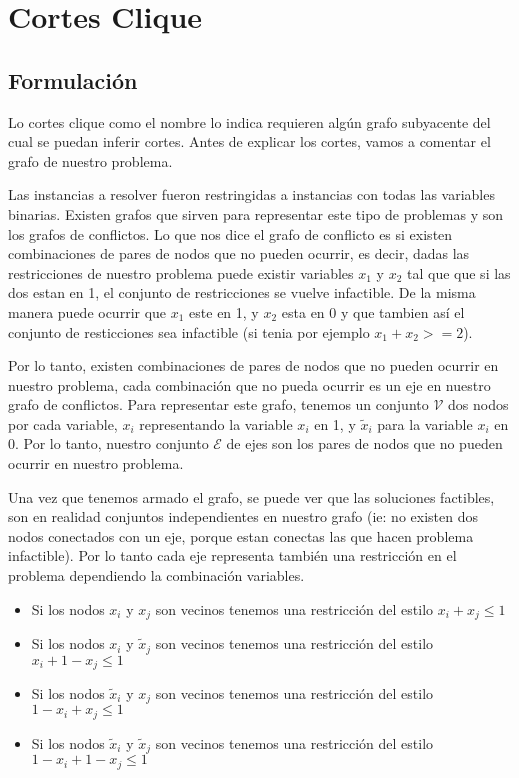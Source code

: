 \section{Cortes Clique}

\bigskip
\subsection{Formulaci\'on}

Lo cortes clique como el nombre lo indica requieren alg\'un grafo subyacente del cual se puedan inferir cortes.
Antes de explicar los cortes, vamos a comentar el grafo de nuestro problema.

Las instancias a resolver fueron restringidas a instancias con todas las variables binarias.
Existen grafos que sirven para representar este tipo de problemas y son los grafos de conflictos.
Lo que nos dice el grafo de conflicto es si existen combinaciones de pares de nodos que no pueden ocurrir, es decir,
dadas las restricciones de nuestro problema puede existir variables $x_1$ y $x_2$ tal que que si las dos estan en 1,
el conjunto de restricciones se vuelve infactible. De la misma manera puede ocurrir que $x_1$ este en 1, y $x_2$ esta en 0 y que tambien
as\'i el conjunto de resticciones sea infactible (si tenia por ejemplo $x_1+x_2>=2$).


Por lo tanto, existen combinaciones de pares de nodos que no pueden ocurrir en nuestro problema, cada combinaci\'on que no pueda ocurrir
es un eje en nuestro grafo de conflictos. Para representar este grafo, tenemos un conjunto $\mathcal{V}$ dos nodos por cada variable, $x_i$
representando la variable $x_i$ en 1, y $\tilde{x}_i$ para la variable $x_i$ en 0. Por lo tanto, nuestro conjunto $\mathcal{E}$ de ejes son los pares de 
nodos que no pueden ocurrir en nuestro problema.

Una vez que tenemos armado el grafo, se puede ver que las soluciones factibles, son en realidad conjuntos independientes en nuestro grafo
(ie: no existen dos nodos conectados con un eje, porque estan conectas las que hacen problema infactible). Por lo tanto cada eje representa
tambi\'en una restricci\'on en el problema dependiendo la combinaci\'on variables.

\begin{itemize}
\item Si los nodos $x_i$ y $x_j$ son vecinos tenemos una restricci\'on del estilo $x_i +x_j \leq 1$
\item Si los nodos $x_i$ y $\tilde{x}_j$ son vecinos tenemos una restricci\'on del estilo $x_i + 1-x_j \leq 1$
\item Si los nodos $\tilde{x}_i$ y $x_j$ son vecinos tenemos una restricci\'on del estilo $1-x_i +x_j \leq 1$
\item Si los nodos $\tilde{x}_i$ y $\tilde{x}_j$ son vecinos tenemos una restricci\'on del estilo $1-x_i + 1-x_j \leq 1$
\end{itemize}

